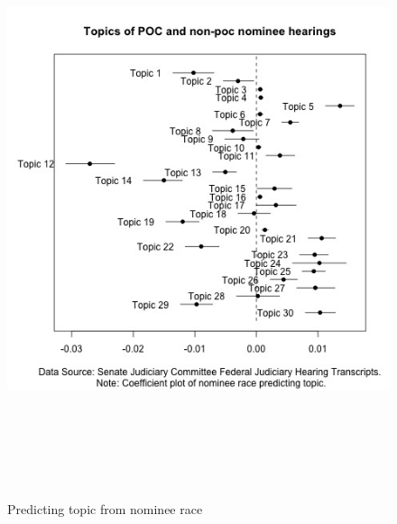 \documentclass [12pt]{article}
\begin{document}
\begin{figure}[H]
    \centering
    \includegraphics[height = 175mm, width = 175mm]{../tables_figures/stm_poc_predict.jpg}
    \caption{Predicting topic from nominee race}
    \label{fig:stm_poc}
\end{figure}
\end{document}
